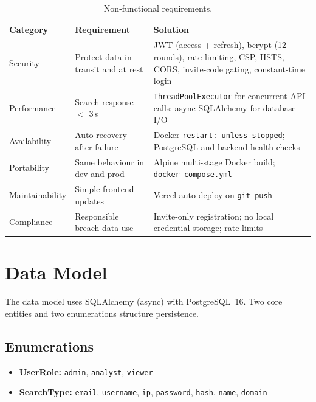 \renewcommand{\arraystretch}{1.45}
\begin{table}[ht]
\centering
\caption{Non-functional requirements.}
\label{tab:nfr}
\small
\begin{tabularx}{\textwidth}{@{} l L{3.5cm} X @{}}
\toprule
\textbf{Category} & \textbf{Requirement} & \textbf{Solution} \\
\midrule
Security &
  Protect data in transit and at rest &
  JWT (access + refresh), bcrypt (12 rounds), rate limiting, CSP, HSTS,
  CORS, invite-code gating, constant-time login \\[8pt]
Performance &
  Search response $<$ 3\,s &
  \texttt{ThreadPoolExecutor} for concurrent API calls; async SQLAlchemy
  for database I/O \\[8pt]
Availability &
  Auto-recovery after failure &
  Docker \texttt{restart: unless-stopped}; PostgreSQL and backend health
  checks \\[8pt]
Portability &
  Same behaviour in dev and prod &
  Alpine multi-stage Docker build; \texttt{docker-compose.yml} \\[8pt]
Maintainability &
  Simple frontend updates &
  Vercel auto-deploy on \texttt{git push} \\[8pt]
Compliance &
  Responsible breach-data use &
  Invite-only registration; no local credential storage; rate limits \\
\bottomrule
\end{tabularx}
\end{table}

\section{Data Model}
\label{sec:datamodel}

The data model uses SQLAlchemy (async) with PostgreSQL~16. Two core entities
and two enumerations structure persistence.

\subsection{Enumerations}

\begin{itemize}[nosep]
  \item \textbf{UserRole:} \texttt{admin}, \texttt{analyst}, \texttt{viewer}
  \item \textbf{SearchType:} \texttt{email}, \texttt{username}, \texttt{ip},
        \texttt{password}, \texttt{hash}, \texttt{name}, \texttt{domain}
\end{itemize}

